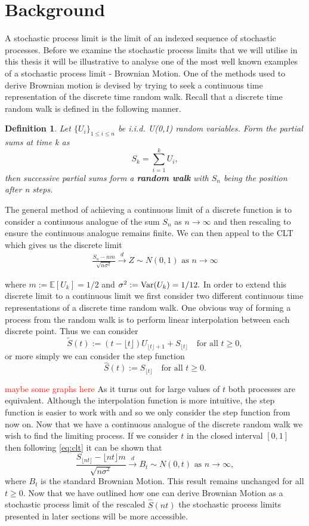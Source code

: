 \documentclass[honours,12pt]{UNSWthesis}
\newcommand{\E}{\mathbb{E}}
\newcommand{\1}{\mathbf 1}
\newcommand{\Var}{\mathop{\rm Var}}
\newtheorem{definition}[theorem]{Definition}
\numberwithin{equation}{section}
\theoremstyle{definition}
\theoremstyle{remark}
\begin{document}
\section{Background}\label{s:background}
A stochastic process limit is the limit of an indexed sequence of stochastic processes. Before we examine the stochastic process limits that we will utilise in this thesis it will be illustrative to analyse one of the most well known examples of a stochastic process limit - Brownian Motion. One of the methods used to derive Brownian motion is devised by trying to seek a continuous time representation of the discrete time random walk. Recall that a discrete time random walk is defined in the following manner.\\
\begin{definition}
Let $\{U_i\}_{1\leq i \leq n}$ be i.i.d. U(0,1) random variables. Form the partial sums at time k as
\[
	S_k=\sum_{i=1}^k U_i,
\]
then successive partial sums form a \textbf{random walk} with $S_n$ being the position after n steps.
\\
\end{definition}
\noindent The general method of achieving a continuous limit of a discrete function is to consider a continuous analogue of the sum $S_n$ as $n\to\infty$ and then rescaling to ensure the continuous analogue remains finite. We can then appeal to the CLT which gives us the discrete limit
\begin{align}\label{eq:clt}
\frac{S_n-nm}{\sqrt{n\sigma^2}}\overset{d}{\to}Z\sim N(0,1)\textrm{ as $n\to\infty$}
\end{align}

\noindent where $m:=\E[U_k]=1/2$ and $\sigma^2:=\Var(U_k)=1/12.$
In order to extend this discrete limit to a continuous limit we first consider two different continuous time representations of a discrete time random walk. One obvious way of forming a process from the random walk is to perform linear interpolation between each discrete point. Thus we can consider
\[
	\tilde{S}(t):=(t-\lfloor t \rfloor)U_{\lfloor t \rfloor +1} + S_{\lfloor t \rfloor}\quad\textrm{for all } t\geq0,
\]
or more simply we can consider the step function
\[
	\hat{S}(t):=S_{\lfloor t \rfloor}\quad\textrm{for all } t\geq0.
\]

\textcolor{red}{maybe some graphs here}
As it turns out for large values of $t$ both processes are equivalent. Although the interpolation function is more intuitive, the step function is easier to work with and so we only consider the step function from now on. Now that we have a continuous analogue of the discrete random walk we wish to find the limiting process. If we consider $t$ in the closed interval $[0,1]$ then following \ref{eq:clt} it can be shown that
\[
	\frac{S_{\lfloor nt\rfloor}-\lfloor nt \rfloor m}{\sqrt{n\sigma^2}}\overset{d}{\to}B_t\sim N(0,t)\textrm{ as $n\to\infty$},
\]
\noindent where $B_t$ is the standard Brownian Motion. This result remains unchanged for all $t\geq0$. Now that we have outlined how one can derive Brownian Motion as a stochastic process limit of the rescaled $\hat{S}(nt)$ the stochastic process limits presented in later sections will be more accessible.
\end{document}
